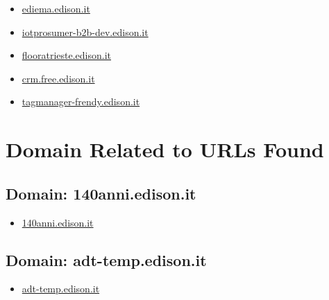 \documentclass{article}
\begin{document}
\begin{itemize}
            
            \item \href{ http://ediema.edison.it/ }{ ediema.edison.it }
        
            
            \item \href{ http://iotprosumer-b2b-dev.edison.it/ }{ iotprosumer-b2b-dev.edison.it }
        
            
            \item \href{ http://flooratrieste.edison.it/ }{ flooratrieste.edison.it }
        
            
            \item \href{ http://crm.free.edison.it/ }{ crm.free.edison.it }
        
            
            \item \href{ http://tagmanager-frendy.edison.it/ }{ tagmanager-frendy.edison.it }
        
    
\end{itemize}

\clearpage

\section{Domain Related to URLs Found}


    
    \subsection{Domain: 140anni.edison.it}
    \begin{itemize}
        
            
                
                \item \href{ https://140anni.edison.it/}{ 140anni.edison.it }
            
        
    \end{itemize}

    \subsection{Domain: adt-temp.edison.it}
    \begin{itemize}
        
            
                
                \item \href{ http://adt-temp.edison.it/}{ adt-temp.edison.it }
            
        
    \end{itemize}
\end{document}
